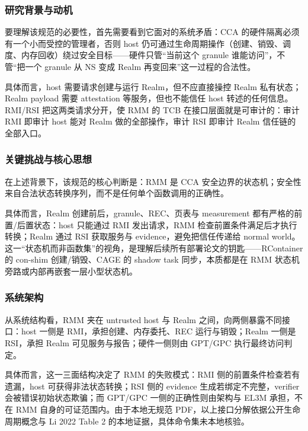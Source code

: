 \documentclass[11pt]{ctexart}
\begin{document}
\subsubsection{研究背景与动机}
要理解该规范的必要性，首先需要看到它面对的系统矛盾：CCA 的硬件隔离必须有一个小而受控的管理者，否则 host 仍可通过生命周期操作（创建、销毁、调度、内存回收）绕过安全目标——硬件只管“当前这个 granule 谁能访问”，不管“把一个 granule 从 NS 变成 Realm 再变回来”这一过程的合法性。\par
具体而言，host 需要请求创建与运行 Realm，但不应直接操控 Realm 私有状态；Realm payload 需要 attestation 等服务，但也不能信任 host 转述的任何信息。RMI/RSI 把这两类请求分开，使 RMM 的 TCB 在接口层面就是可审计的：审计 RMI 即审计 host 能对 Realm 做的全部操作，审计 RSI 即审计 Realm 信任链的全部入口。\par
\subsubsection{关键挑战与核心思想}
在上述背景下，该规范的核心判断是：RMM 是 CCA 安全边界的状态机；安全性来自合法状态转换序列，而不是任何单个函数调用的正确性。\par
具体而言，Realm 创建前后，granule、REC、页表与 measurement 都有严格的前置/后置状态：host 只能通过 RMI 发出请求，RMM 检查前置条件满足后才执行转换；Realm 通过 RSI 获取服务与 evidence，避免把信任传递给 normal world。这一“状态机而非函数集”的视角，是理解后续所有部署论文的钥匙——RContainer 的 con-shim 创建/销毁、CAGE 的 shadow task 同步，本质都是在 RMM 状态机旁路或内部再嵌套一层小型状态机。\par
\subsubsection{系统架构}
从系统结构看，RMM 夹在 untrusted host 与 Realm 之间，向两侧暴露不同接口：host 一侧是 RMI，承担创建、内存委托、REC 运行与销毁；Realm 一侧是 RSI，承担 Realm 可见服务与报告；硬件一侧则由 GPT/GPC 执行最终访问判定。\par
具体而言，这一三面结构决定了 RMM 的失败模式：RMI 侧的前置条件检查若有遗漏，host 可获得非法状态转换；RSI 侧的 evidence 生成若绑定不完整，verifier 会被错误初始状态欺骗；而 GPT/GPC 一侧的正确性则由架构与 EL3M 承担，不在 RMM 自身的可证范围内。由于本地无规范 PDF，以上接口分解依据公开生命周期概念与 Li 2022 Table 2 的本地证据，具体命令集未本地核验。\par
\end{document}
